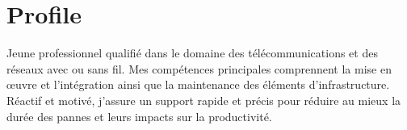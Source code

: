 \section{Profile}

\qquad Jeune professionnel qualifié dans le domaine des télécommunications et des réseaux avec ou sans fil. Mes compétences principales comprennent la mise en œuvre et l’intégration ainsi que la maintenance des éléments d’infrastructure. Réactif et motivé, j'assure un support rapide et précis pour réduire au mieux la durée des pannes et leurs impacts sur la productivité.